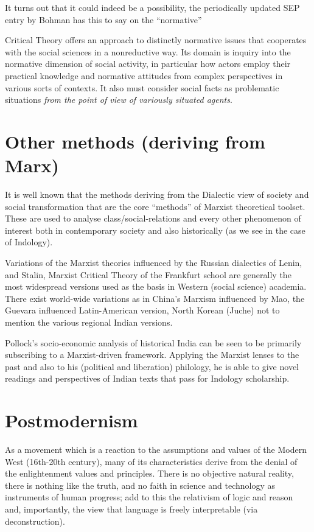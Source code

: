 It turns out that it could indeed be a possibility, the periodically updated SEP entry by Bohman has this to say on the ``normative''
\begin{myquote}
Critical Theory offers an approach to distinctly normative issues that cooperates with the social sciences in a nonreductive way. Its domain is inquiry into the normative dimension of social activity, in particular how actors employ their practical knowledge and normative attitudes from complex perspectives in various sorts of contexts. It also must consider social facts as problematic situations {{\sl from the point of view of variously situated agents}\relax}.
\end{myquote}

\newpage

\section*{Other methods (deriving from Marx)}

It is well known that the methods deriving  from the Dialectic view of society and social transformation that are the core ``methods'' of Marxist theoretical toolset. These are used to analyse class/social-relations and every other phenomenon of interest both in contemporary society and also historically (as we see in the case of Indology).

Variations of the Marxist theories influenced by the Russian dialectics of Lenin, and Stalin, Marxist Critical Theory of the Frankfurt school are generally the most widespread versions used as the basis in Western (social science) academia. There exist world-wide variations as in China's Marxism influenced by Mao, the Guevara influenced Latin-American version, North Korean (Juche) not to mention the various regional Indian versions.

Pollock's socio-economic analysis of historical India can be seen to be primarily subscribing to a Marxist-driven framework. Applying the Marxist lenses to the past and also to his (political and liberation) philology, he is able to give novel readings and perspectives of Indian texts that pass for Indology scholarship.

\section*{Postmodernism}

As a movement which is a reaction to the assumptions and values of the Modern West (16th-20th century), many of its characteristics derive from the denial of the enlightenment values and principles. There is no objective natural reality, there is nothing like the truth, and no faith in science and technology as instruments of human progress; add to this the relativism of logic and reason and, importantly, the view that language is freely interpretable (via deconstruction). 

